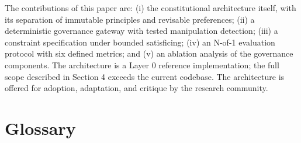 \documentclass[11pt,a4paper]{article}
\begin{document}
The contributions of this paper are: (i) the constitutional architecture itself, with its separation of immutable principles and revisable preferences; (ii) a deterministic governance gateway with tested manipulation detection; (iii) a constraint specification under bounded satisficing; (iv) an N-of-1 evaluation protocol with six defined metrics; and (v) an ablation analysis of the governance components. The architecture is a Layer 0 reference implementation; the full scope described in Section 4 exceeds the current codebase. The architecture is offered for adoption, adaptation, and critique by the research community.

\appendix
\section{Glossary}
\end{document}
